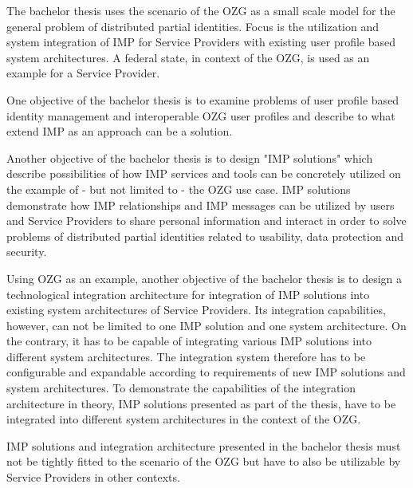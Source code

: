 The bachelor thesis uses the scenario of the OZG as a small scale model for the general problem of distributed partial identities. Focus is the utilization and system integration of IMP for Service Providers with existing user profile based system architectures. A federal state, in context of the OZG, is used as an example for a Service Provider.

One objective of the bachelor thesis is to examine problems of user profile based identity management and interoperable OZG user profiles and describe to what extend IMP as an approach can be a solution.

Another objective of the bachelor thesis is to design "IMP solutions" which describe possibilities of how IMP services and tools can be concretely utilized on the example of - but not limited to - the OZG use case. IMP solutions demonstrate how IMP relationships and IMP messages can be utilized by users and Service Providers to share personal information and interact in order to solve problems of distributed partial identities related to usability, data protection and security.

Using OZG as an example, another objective of the bachelor thesis is to design a technological integration architecture for integration of IMP solutions into existing system architectures of Service Providers. Its integration capabilities, however, can not be limited to one IMP solution and one system architecture. On the contrary, it has to be capable of integrating various IMP solutions into different system architectures. The integration system therefore has to be configurable and expandable according to requirements of new IMP solutions and system architectures. To demonstrate the capabilities of the integration architecture in theory, IMP solutions presented as part of the thesis, have to be integrated into different system architectures in the context of the OZG.

IMP solutions and integration architecture presented in the bachelor thesis must not be tightly fitted to the scenario of the OZG but have to also be utilizable by Service Providers in other contexts.